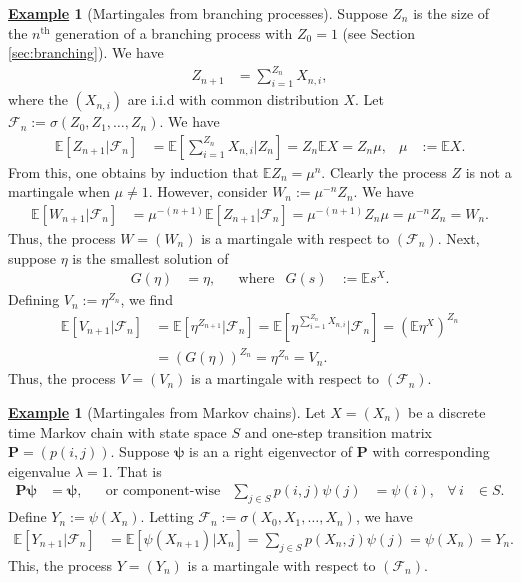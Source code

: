 \documentclass[12pt]{book}
\numberwithin{equation}{chapter}
\theoremstyle{plain}
\numberwithin{theorem}{section}
\theoremstyle{definition}
\newtheorem{example}[theorem]{\underline{Example}}
\numberwithin{exercise}{chapter}
\newcommand{\<}{\langle}
\renewcommand{\>}{\rangle}
\renewcommand{\(}{\left(}
\renewcommand{\)}{\right)}
\renewcommand{\[}{\left[}
\renewcommand{\]}{\right]}
\newcommand\Eb{\mathds{E}}
\newcommand\Fc{\mathscr{F}}
\newcommand\sig{\sigma}
\newcommand\lam{\lambda}
\newcommand\Pv{\pmb{P}}
\newcommand\psiv{\pmb{\psi}}
\begin{document}
\begin{example}[Martingales from branching processes]
Suppose $Z_n$ is the size of the $n^\text{th}$ generation of a branching process with $Z_0 = 1$ (see Section \ref{sec:branching}).  We have
\begin{align}
Z_{n+1} 
	&=	\sum_{i=1}^{Z_n} X_{n,i} ,
\end{align}
where the $(X_{n,i})$ are i.i.d with common distribution $X$.  Let $\Fc_n := \sig(Z_0,Z_1,\ldots,Z_n)$.  We have
\begin{align}
\Eb [ Z_{n+1} | \Fc_n ]
	&=	\Eb [ \sum_{i=1}^{Z_n} X_{n,i} | Z_n ] 
	=		Z_n \Eb X
	=	Z_n \mu , &
\mu
	&:=	\Eb X .
\end{align}
From this, one obtains by induction that $\Eb Z_n = \mu^n$.  Clearly the process $Z$ is not a martingale when $\mu \neq 1$.  However, consider $W_n := \mu^{-n}Z_n$.  We have
\begin{align}
\Eb [ W_{n+1} | \Fc_n ]
	&=	\mu^{-(n+1)} \Eb [ Z_{n+1} | \Fc_n ] 
	=	\mu^{-(n+1)} Z_n \mu 
	=	\mu^{-n} Z_n 
	=		W_n .
\end{align}
Thus, the process $W = (W_n)$ is a martingale with respect to $(\Fc_n)$.  Next, suppose $\eta$ is the smallest solution of
\begin{align}
G(\eta)
	&=	\eta , &
	&\text{where}&
G(s)
	&:=	\Eb s^X .
\end{align}
Defining $V_n := \eta^{Z_n} $, we find
\begin{align}
\Eb[ V_{n+1} | \Fc_n ]
	&=	\Eb[ \eta^{Z_{n+1}} | \Fc_n ]
	=		\Eb[ \eta^{\sum_{i=1}^{Z_n}X_{n,i}} | \Fc_n ]
	=		(\Eb \eta^X)^{Z_n} \\
	&=	( G(\eta) )^{Z_n}
	=		\eta^{Z_n}
	=		V_n .
\end{align}
Thus, the process $V = (V_n)$ is a martingale with respect to $(\Fc_n)$.
\end{example}

\begin{example}[Martingales from Markov chains]
Let $X = (X_n)$ be a discrete time Markov chain with state space $S$ and one-step transition matrix $\Pv = (p(i,j))$.  Suppose $\psiv$ is an a right eigenvector of $\Pv$ with corresponding eigenvalue $\lam = 1$.  That is
\begin{align}
\Pv \psiv
	&=	\psiv , &
	&\text{or component-wise}&
\sum_{j \in S} p(i,j) \psi(j)
	&=	\psi(i) , &
\forall \, i
	&\in S .
\end{align}
Define $Y_n := \psi(X_n)$.  Letting $\Fc_n := \sig(X_0,X_1,\ldots,X_n)$, we have
\begin{align}
\Eb[ Y_{n+1} | \Fc_n ]
	&=	 \Eb[ \psi(X_{n+1}) | X_n ]
	=		\sum_{j \in S} p(X_n,j) \psi(j)
	=		\psi(X_n)
	=		Y_n .
\end{align}
This, the process $Y = (Y_n)$ is a martingale with respect to $(\Fc_n)$.
\end{example}
\end{document}
